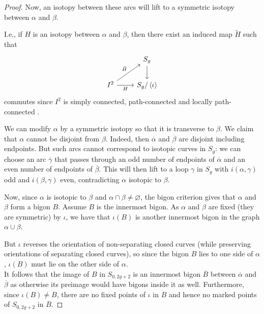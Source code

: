 \documentclass[reqno]{amsart}
\theoremstyle{definition}
\theoremstyle{remark}
\begin{document}
\begin{proof}
       
       Now, an isotopy between
       these arcs will lift to a symmetric isotopy
       between $\alpha$ and $\beta$.


       I.e., if
       $H$ is an isotopy between $\alpha$ and $\beta$, then
       there exist an induced map $\tilde{H}$ such that
       \begin{equation*}
       \begin{tikzcd}
           & S_g \ar[d] \\
           I^2 \ar[ru, "\tilde{H}"] \ar[r, "H"'] &
           S_g / \left<\iota \right>
       \end{tikzcd}
       \end{equation*}
       commutes since $I^2$ is simply connected,
       path-connected and locally path-connected
       \cite[Cor~4.2]{Bredon}.
       
       We can modify $\alpha$ by a symmetric
       isotopy so that it is transverse to $\beta$.
       We claim that $\alpha$ cannot be
       disjoint from $\beta$. Indeed,
       then $\overline{\alpha}$ and $\overline{\beta}$ 
       are disjoint including endpoints. But
       such arcs cannot correspond
       to isotopic curves in $S_g$: we can choose
       an arc $\overline{\gamma}$ that passes through
        an odd number of endpoints of
        $\overline{\alpha}$ and
        an even number of endpoints of $\overline{\beta}$.
        This will then lift to a loop
        $\gamma$ in $S_g$ with
        $i \left( \alpha, \gamma \right) $ odd
        and $i \left( \beta, \gamma \right) $ even, contradicting
        $\alpha$ isotopic to $\beta$.

        Now, since $\alpha$ is isotopic to $\beta$ and
        $\alpha \cap \beta \neq \varnothing$, the bigon
        criterion gives that
        $\alpha$ and $\beta$ form a bigon $B$. Assume
        $B$ is the innermost bigon. As
        $\alpha$ and $\beta$ are fixed (they are symmetric) by
        $\iota$, we have that $\iota (B)$ is another
        innermost bigon in the graph
        $\alpha \cup \beta$.

        But $\iota$ reverses the orientation of non-separating
        closed curves (while preserving orientations
        of separating closed curves), so
        since the bigon $B$ lies to one side of $\alpha$,
        $\iota(B)$ must lie on the other side of $\alpha$.\\
        \linebreak
        It follows that the image of 
        $B$ in $S_{0,2g+2}$ is an innermost bigon $\overline{B}$ 
        between $\overline{\alpha}$ and $\overline{\beta}$ as
        otherwise its preimage would have bigons inside it
        as well.
        Furthermore, since $\iota (B) \neq B$, there are
        no fixed points of $\iota$ in $B$ and hence
        no marked points of
        $S_{0,2g+2}$ in $\overline{B}$.


\end{proof}
\end{document}
